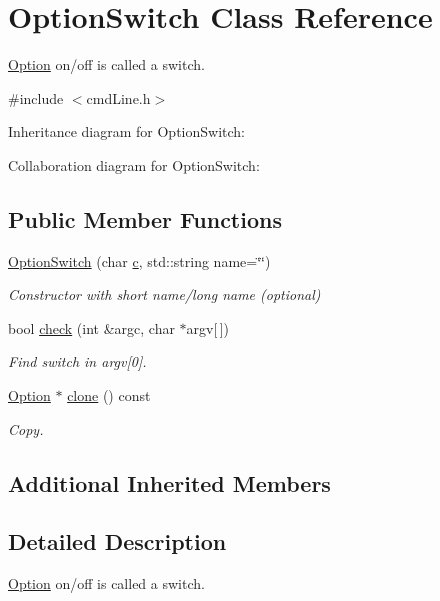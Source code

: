 \hypertarget{classOptionSwitch}{}\section{Option\+Switch Class Reference}
\label{classOptionSwitch}


\hyperlink{classOption}{Option} on/off is called a switch.  




{\ttfamily \#include $<$cmd\+Line.\+h$>$}



Inheritance diagram for Option\+Switch\+:


Collaboration diagram for Option\+Switch\+:
\subsection*{Public Member Functions}
\begin{DoxyCompactItemize}
\item 
\hyperlink{classOptionSwitch_a49c60879155918901861117f1d929da3}{Option\+Switch} (char \hyperlink{classOption_a496b793630fcab592951643fe2c651d6}{c}, std\+::string name=\char`\"{}\char`\"{})
\begin{DoxyCompactList}\small\item\em Constructor with short name/long name (optional) \end{DoxyCompactList}\item 
bool \hyperlink{classOptionSwitch_a9ed02f4e091717188affd670c1389b93}{check} (int \&argc, char $\ast$argv\mbox{[}$\,$\mbox{]})
\begin{DoxyCompactList}\small\item\em Find switch in argv\mbox{[}0\mbox{]}. \end{DoxyCompactList}\item 
\hyperlink{classOption}{Option} $\ast$ \hyperlink{classOptionSwitch_a339139802b4b9669886e7d5e0b712b47}{clone} () const 
\begin{DoxyCompactList}\small\item\em Copy. \end{DoxyCompactList}\end{DoxyCompactItemize}
\subsection*{Additional Inherited Members}


\subsection{Detailed Description}
\hyperlink{classOption}{Option} on/off is called a switch. 

